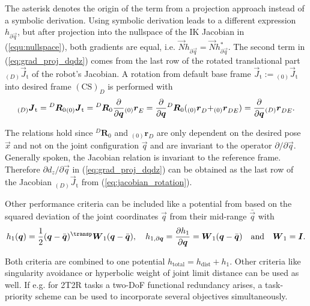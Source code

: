 \documentclass[graybox,vecphys]{svmult}
\newcommand{\rotmat}[2]{{{ }^{#1}\boldsymbol{R}}_{#2}}
\newcommand{\ks}[1]{{(\mathrm{CS})_{#1}}}
\newcommand{\ortvek}[4]{{ }_{(#1)}{\boldsymbol{#2}}^{#3}_{#4} }
\begin{document}
The asterisk denotes the origin of the term from a projection approach instead of a symbolic derivation.
Using symbolic derivation leads to a different expression $h_{\partial \vec{q}}$, but after projection into the nullspace of the IK Jacobian in (\ref{equ:nullspace}), both gradients are equal, i.e. $\vec{N} h_{\partial \vec{q}}=\vec{N} h_{\partial \vec{q}}^{*} $.
The second term in (\ref{eq:grad_proj_dqdz}) comes from the last row of the rotated translational part ${_{(D)}\vec{J}_\mathrm{t}}$ of the robot's Jacobian.
A rotation from default base frame $\vec{J}_\mathrm{t}{:=}{_{(0)}\vec{J}_\mathrm{t}}$ into desired frame $\ks{D}$ is performed with
%
\vspace{-0.2cm}
\begin{equation}
{_{(D)}\vec{J}_\mathrm{t}} 
= 
\rotmat{D}{0} {_{(0)}\vec{J}_\mathrm{t}}
=
\rotmat{D}{0}
\frac{\partial}{\partial \vec{q}} \ortvek{0}{r}{}{E}
=
\frac{\partial}{\partial \vec{q}} 
\rotmat{D}{0}
(\ortvek{0}{r}{}{D} {+} \ortvek{0}{r}{}{DE})
=
\frac{\partial}{\partial \vec{q}} \ortvek{D}{r}{}{DE}.
\label{eq:jacobian_rotation}
\vspace{-0.1cm}
\end{equation}

The relations hold since $\rotmat{D}{0}$ and $\ortvek{0}{r}{}{D}$ are only dependent on the desired pose $\vec{x}$ and not on the joint configuration $\vec{q}$ and are invariant to the operator $\partial/\partial \vec{q}$.
Generally spoken, the Jacobian relation is invariant to the reference frame.
Therefore $\partial d_z / \partial \vec{q}$ in (\ref{eq:grad_proj_dqdz}) can be obtained as the last row of the Jacobian ${_{(D)}\vec{J}_\mathrm{t}}$ from (\ref{eq:jacobian_rotation}).

Other performance criteria can be included like a potential from \cite{HuoBar2008} based on the squared deviation of the joint coordinates $\vec{q}$ from their mid-range $\bar{\vec{q}}$ with
%
\vspace{-0.1cm}
\begin{equation}
h_1(\vec{q})
=
\frac{1}{2} (\vec{q}-\bar{\vec{q}})^\transp\vec{W}_1(\vec{q}-\bar{\vec{q}}),
\quad
h_{1,\partial\vec{q}}
=
\frac{\partial h_1}{\partial \vec{q}}
=
\vec{W}_1(\vec{q}-\bar{\vec{q}}) 
\quad \mathrm{and} \quad \vec{W}_1=\vec{I}.
\label{equ:h_qlim_par}
\vspace{-0.1cm}
\end{equation}

Both criteria are combined to one potential $h_{\mathrm{total}}=h_{\mathrm{dist}} + h_1$.
Other criteria like singularity avoidance \cite{HuoBar2008} or hyperbolic weight of joint limit distance \cite{ZhuQuCaoYan2013} can be used as well.
If e.g. for 2T2R tasks a two-DoF functional redundancy arises, a task-priority scheme \cite{MoeAntTeePet2016} can be used to incorporate several objectives simultaneously.
\end{document}
